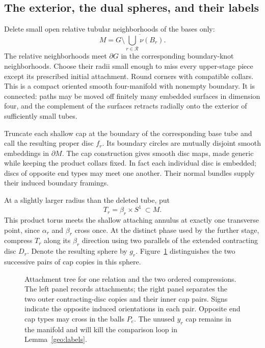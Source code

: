 \subsection{The exterior, the dual spheres, and their labels}

Delete small open relative tubular neighborhoods of the bases only:
\begin{equation}\label{geo:exterior}
 M=\overline{G\setminus\bigcup_{r\in\mathcal R}
                                      \nu(B_r)}.
\end{equation}
The relative neighborhoods meet $\partial G$ in the corresponding
boundary-knot neighborhoods.  Choose their radii small enough to
miss every upper-stage piece except its prescribed initial
attachment.  Round corners with compatible collars.  This is a
compact oriented smooth four-manifold with nonempty boundary.
It is connected: paths may be moved off finitely many embedded
surfaces in dimension four, and the complement of the surfaces
retracts radially onto the exterior of sufficiently small tubes.

Truncate each shallow cap at the boundary of the corresponding
base tube and call the resulting proper disc $f_r$.  Its boundary
circles are mutually disjoint smooth embeddings in $\partial M$.
The cap construction gives smooth disc maps, made generic while
keeping the product collars fixed.  In fact each individual disc
is embedded; discs of opposite end types may meet one another.
Their normal bundles supply their induced boundary framings.

At a slightly larger radius than the deleted tube, put
\[
 T_r=\beta_r\times S^1\ \subset M.
\]
This product torus meets the shallow attaching annulus at exactly
one transverse point, since $\alpha_r$ and $\beta_r$ cross once.
At the distinct phase used by the further stage, compress $T_r$
along its $\beta_r$ direction using two parallels of the extended
contracting disc $D_r$.  Denote the resulting sphere by $g_r$.
Figure~\ref{geo:fig-stages} distinguishes the two successive pairs of
cap copies in this sphere.

\suppressfloats[t]
\begin{figure}[!ht]
\centering

\caption{Attachment tree for one relation and the two ordered
compressions.  The left panel records attachments; the right panel
separates the two outer contracting-disc copies and their inner cap pairs.
Signs indicate the opposite induced orientations in each pair.
Opposite end cap types may cross in the balls $P_e$.  The unused $y_r$ cap
remains in the manifold and will kill the comparison loop in
Lemma~\ref{geo:labels}.}\label{geo:fig-stages}
\end{figure}

